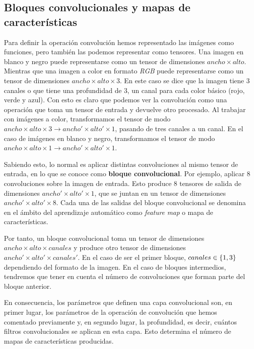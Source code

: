 \subsection{Bloques convolucionales y mapas de características}

Para definir la operación convolución hemos representado las imágenes como funciones, pero también las podemos representar como tensores. Una imagen en blanco y negro puede representarse como un tensor de dimensiones $ancho \times alto$. Mientras que una imagen a color en formato \textit{RGB} puede representarse como un tensor de dimensiones $ancho \times alto \times 3$. En este caso se dice que la imagen tiene 3 canales o que tiene una profundidad de 3, un canal para cada color básico (rojo, verde y azul). Con esto es claro que podemos ver la convolución como una operación que toma un tensor de entrada y devuelve otro procesado. Al trabajar con imágenes a color, transformamos el tensor de modo $ancho \times alto \times 3 \to ancho' \times alto' \times 1$, pasando de tres canales a un canal. En el caso de imágenes en blanco y negro, transformamos el tensor de modo $ancho \times alto \times 1 \to ancho' \times alto' \times 1$.

Sabiendo esto, lo normal es aplicar distintas convoluciones al mismo tensor de entrada, en lo que se conoce como \textbf{bloque convolucional}. Por ejemplo, aplicar 8 convoluciones sobre la imagen de entrada. Esto produce 8 tensores de salida de dimensiones $ancho' \times alto' \times 1$, que se juntan en un tensor de dimensiones $ancho' \times alto' \times 8$. Cada una de las salidas del bloque convolucional se denomina en el ámbito del aprendizaje automático como \textit{feature map} o mapa de características.

Por tanto, un bloque convolucional toma un tensor de dimensiones $ancho \times alto \times canales$ y produce otro tensor de dimensiones $ancho' \times alto' \times canales'$. En el caso de ser el primer bloque, $canales \in \{ 1, 3 \}$ dependiendo del formato de la imagen. En el caso de bloques intermedios, tendremos que tener en cuenta el número de convoluciones que forman parte del bloque anterior.

En consecuencia, los parámetros que definen una capa convolucional son, en primer lugar, los parámetros de la operación de convolución que hemos comentado previamente y, en segundo lugar, la profundidad, es decir, cuántos filtros convolucionales se aplican en esta capa. Esto determina el número de mapas de características producidas.

